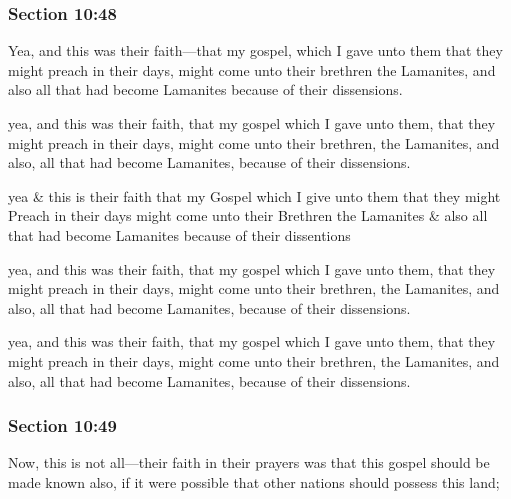 	\subsubsection{Section 10:48} %
		\label{DC10-48}

		Yea, and this was their faith---that my gospel, which I gave unto them that they might preach in their days, might come unto their brethren the Lamanites, and also all that had become Lamanites because of their dissensions.

		\begin{framed}
		\scriptsize
			\begin{compactdesc}
				\item[JSP] yea, and this was their faith, that my gospel which I gave unto them, that they might preach in their days, might come unto their brethren, the Lamanites, and also, all that had become Lamanites, because of their dissensions.
				\item[RB1] yea \& this is their faith that my Gospel which I give unto them that they might Preach in their days might come unto their Brethren the Lamanites \& also all that had become Lamanites because of their dissentions
				\item[DC 1835] yea, and this was their faith, that my gospel which I gave unto them, that they might preach in their days, might come unto their brethren, the Lamanites, and also, all that had become Lamanites, because of their dissensions.
				\item[DC 1844] yea, and this was their faith, that my gospel which I gave unto them, that they might preach in their days, might come unto their brethren, the Lamanites, and also, all that had become Lamanites, because of their dissensions.
			\end{compactdesc}
		\end{framed}

	\subsubsection{Section 10:49} %
		\label{DC10-49}

		Now, this is not all---their faith in their prayers was that this gospel should be made known also, if it were possible that other nations should possess this land;

